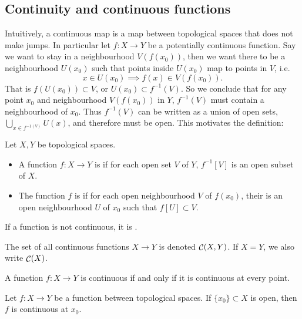 \subsection{Continuity and continuous functions}
Intuitively, a continuous map is a map between topological spaces that does not make jumps. In particular let $f: X\to Y$ be a potentially continuous function. Say we want to stay in a neighbourhood $V(f(x_0))$, then we want there to be a neighbourhood $U(x_0)$ such that points inside $U(x_0)$ map to points in $V$, i.e.
\[ x\in U(x_0) \implies f(x) \in V(f(x_0)). \]
That is $f(U(x_0)) \subset V$, or $U(x_0)\subset f^{-1}(V)$. So we conclude that for any point $x_0$ and neighbourhood $V(f(x_0))$ in $Y$, $f^{-1}(V)$ must contain a neighbourhood of $x_0$. Thus $f^{-1}(V)$ can be written as a union of open sets, $\bigcup_{x\in f^{-1(V)}}U(x)$, and therefore must be open. This motivates the definition:
\begin{definition}
Let $X,Y$ be topological spaces.
\begin{itemize}
\item A function $f:X\to Y$ is  if for each open set $V$ of $Y$, $f^{-1}[V]$ is an open subset of $X$.
\item The function $f$ is  if for each open neighbourhood $V$ of $f(x_0)$, their is an open neighbourhood $U$ of $x_0$ such that $f[U]\subset V$.
\end{itemize}
If a function is not continuous, it is .

The set of all continuous functions $X\to Y$ is denoted $\mathop{\mathcal{C}}(X,Y)$. If $X=Y$, we also write $\mathop{\mathcal{C}}(X)$.
\end{definition}
\begin{lemma} \label{globalContinuityFromAllPoints}
A function $f:X\to Y$ is continuous \textup{if and only if} it is continuous at every point.
\end{lemma}

\begin{lemma} \label{continuityAtIsolatedPoint}
Let $f:X\to Y$ be a function between topological spaces. If $\{x_0\}\subset X$ is open, then $f$ is continuous at $x_0$.
\end{lemma}

